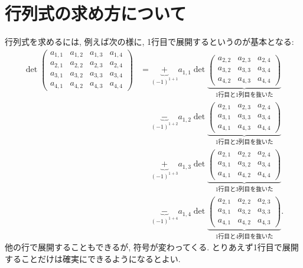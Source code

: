 \section{行列式の求め方について}
行列式を求めるには, 例えば次の様に,
1行目で展開するというのが基本となる:
\begin{align*}
  \det
  \begin{pmatrix}
    a_{1,1} & a_{1,2} & a_{1,3} & a_{1,4}\\
    a_{2,1} & a_{2,2} & a_{2,3} & a_{2,4}\\
    a_{3,1} & a_{3,2} & a_{3,3} & a_{3,4}\\
    a_{4,1} & a_{4,2} & a_{4,3} & a_{4,4}
  \end{pmatrix}
  &=
    \underbrace{+}_{(-1)^{1+1}} a_{1,1}
  \det
  \underbrace{\begin{pmatrix}
     a_{2,2} & a_{2,3} & a_{2,4}\\
     a_{3,2} & a_{3,3} & a_{3,4}\\
     a_{4,2} & a_{4,3} & a_{4,4}
  \end{pmatrix}}_{\text{1行目と1列目を抜いた}}
  \\
  &\phantom{{}={}}
    \underbrace{-}_{(-1)^{1+2}} a_{1,2}
  \det
  \underbrace{\begin{pmatrix}
    a_{2,1}  & a_{2,3} & a_{2,4}\\
    a_{3,1}  & a_{3,3} & a_{3,4}\\
    a_{4,1}  & a_{4,3} & a_{4,4}
  \end{pmatrix}}_{\text{1行目と2列目を抜いた}}
  \\
  &\phantom{{}={}}
    \underbrace{+}_{(-1)^{1+3}} a_{1,3}
  \det
  \underbrace{\begin{pmatrix}
    a_{2,1} & a_{2,2}  & a_{2,4}\\
    a_{3,1} & a_{3,2}  & a_{3,4}\\
    a_{4,1} & a_{4,2}  & a_{4,4}
  \end{pmatrix}}_{\text{1行目と3列目を抜いた}}
  \\
  &\phantom{{}={}}
    \underbrace{-}_{(-1)^{1+4}} a_{1,4}
  \det
  \underbrace{\begin{pmatrix}
    a_{2,1} & a_{2,2} & a_{2,3} \\
    a_{3,1} & a_{3,2} & a_{3,3}\\
    a_{4,1} & a_{4,2} & a_{4,3} 
  \end{pmatrix}}_{\text{1行目と4列目を抜いた}}.
\end{align*}
他の行で展開することもできるが,
符号が変わってくる.
とりあえず1行目で展開することだけは確実にできるようになるとよい.

